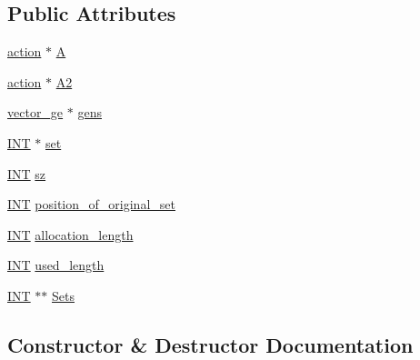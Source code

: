 \subsection*{Public Attributes}
\begin{DoxyCompactItemize}
\item 
\mbox{\hyperlink{classaction}{action}} $\ast$ \mbox{\hyperlink{classorbit__of__sets_ae6f3ca2a2cd1c8166ec4addaba4612c6}{A}}
\item 
\mbox{\hyperlink{classaction}{action}} $\ast$ \mbox{\hyperlink{classorbit__of__sets_a3f546125b2bbc0c95d34ede32bc2b62f}{A2}}
\item 
\mbox{\hyperlink{classvector__ge}{vector\+\_\+ge}} $\ast$ \mbox{\hyperlink{classorbit__of__sets_a20541d9a8d95cd3c60e667904823185b}{gens}}
\item 
\mbox{\hyperlink{galois_8h_a09fddde158a3a20bd2dcadb609de11dc}{I\+NT}} $\ast$ \mbox{\hyperlink{classorbit__of__sets_a20978a7826fed006877674510fa2779b}{set}}
\item 
\mbox{\hyperlink{galois_8h_a09fddde158a3a20bd2dcadb609de11dc}{I\+NT}} \mbox{\hyperlink{classorbit__of__sets_a8b823e6f6f88c55c84bf1a1449f383ed}{sz}}
\item 
\mbox{\hyperlink{galois_8h_a09fddde158a3a20bd2dcadb609de11dc}{I\+NT}} \mbox{\hyperlink{classorbit__of__sets_a6652ddc5c318196c1b66403c23e0b40a}{position\+\_\+of\+\_\+original\+\_\+set}}
\item 
\mbox{\hyperlink{galois_8h_a09fddde158a3a20bd2dcadb609de11dc}{I\+NT}} \mbox{\hyperlink{classorbit__of__sets_a1d11405966012e565e6cb0ea9c11674e}{allocation\+\_\+length}}
\item 
\mbox{\hyperlink{galois_8h_a09fddde158a3a20bd2dcadb609de11dc}{I\+NT}} \mbox{\hyperlink{classorbit__of__sets_a9acc3d48538bce4c7867fba8eee97b4a}{used\+\_\+length}}
\item 
\mbox{\hyperlink{galois_8h_a09fddde158a3a20bd2dcadb609de11dc}{I\+NT}} $\ast$$\ast$ \mbox{\hyperlink{classorbit__of__sets_ac1ce1cce6105af1ed7796125af2c5374}{Sets}}
\end{DoxyCompactItemize}


\subsection{Constructor \& Destructor Documentation}
\mbox{\label{classorbit__of__sets_aca8dee06bc730f4a3b0ef5f96747cc38}} 
